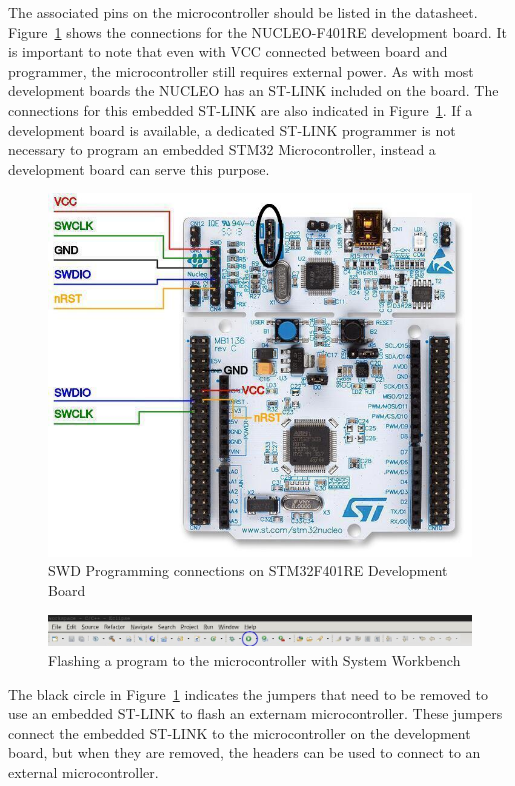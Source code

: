 \documentclass{article}
\begin{document}
  The associated pins on the microcontroller should be listed in the datasheet.
  Figure~\ref{fig:nucleo_swd_connections} shows the connections for the
  NUCLEO-F401RE development board. It is important to note that even with VCC
  connected between board and programmer, the microcontroller still requires
  external power.  As with most development boards the NUCLEO has an ST-LINK
  included on the board. The connections for this embedded ST-LINK are also
  indicated in Figure~\ref{fig:nucleo_swd_connections}. If a development board
  is available, a dedicated ST-LINK programmer is not necessary to program an
  embedded STM32 Microcontroller, instead a development board can serve this
  purpose.

  \begin{figure}[ht]
    \centering
    \includegraphics[width=.65\textwidth]{images/programming/stm32_nucleo_f401re_connections.jpg}
    \caption{SWD Programming connections on STM32F401RE Development Board}
    \label{fig:nucleo_swd_connections}
  \end{figure}

  \begin{figure}[ht]
    \includegraphics[width=\textwidth]{images/programming/syswb_flash.jpg}
    \caption{Flashing a program to the microcontroller with System Workbench}
  \end{figure}

  The black circle in Figure~\ref{fig:nucleo_swd_connections} indicates the
  jumpers that need to be removed to use an embedded ST-LINK to flash an
  externam microcontroller. These jumpers connect the embedded ST-LINK to the
  microcontroller on the development board, but when they are removed, the
  headers can be used to connect to an external microcontroller.
\end{document}
